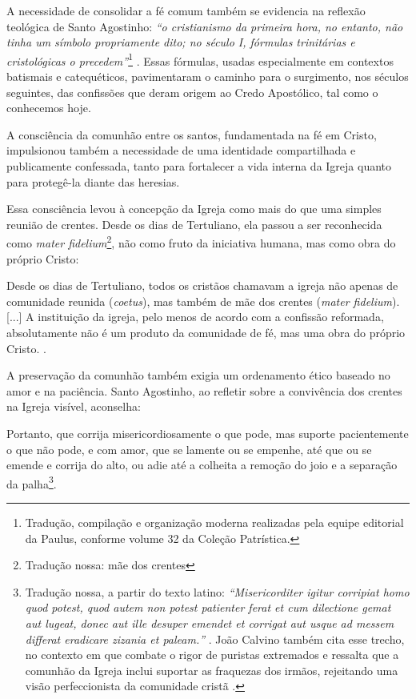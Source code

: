 A necessidade de consolidar a fé comum também se evidencia na reflexão teológica de Santo Agostinho: \textit{``o cristianismo da primeira hora, no entanto, não tinha um símbolo propriamente dito; no século I, fórmulas trinitárias e cristológicas o precedem''}\footnote{Tradução, compilação e organização moderna realizadas pela equipe editorial da Paulus, conforme volume 32 da Coleção Patrística.} \cite[p.~8]{santos2013}. Essas fórmulas, usadas especialmente em contextos batismais e catequéticos, pavimentaram o caminho para o surgimento, nos séculos seguintes, das confissões que deram origem ao Credo Apostólico, tal como o conhecemos hoje.

A consciência da comunhão entre os santos, fundamentada na fé em Cristo, impulsionou também a necessidade de uma identidade compartilhada e publicamente confessada, tanto para fortalecer a vida interna da Igreja quanto para protegê-la diante das heresias.

Essa consciência levou à concepção da Igreja como mais do que uma simples reunião de crentes. Desde os dias de Tertuliano, ela passou a ser reconhecida como \textit{mater fidelium}\footnote{Tradução nossa: mãe dos crentes}, não como fruto da iniciativa humana, mas como obra do próprio Cristo:

\begin{citacao}
    Desde os dias de Tertuliano, todos os cristãos chamavam a igreja não apenas de comunidade reunida (\textit{coetus}), mas também de mãe dos crentes (\textit{mater fidelium}). [...] A instituição da igreja, pelo menos de acordo com a confissão reformada, absolutamente não é um produto da comunidade de fé, mas uma obra do próprio Cristo. \cite[p.~335]{bavinck2012}.
\end{citacao}

A preservação da comunhão também exigia um ordenamento ético baseado no amor e na paciência. Santo Agostinho, ao refletir sobre a convivência dos crentes na Igreja visível, aconselha:

\begin{citacao}
    Portanto, que corrija misericordiosamente o que pode, mas suporte pacientemente o que não pode, e com amor, que se lamente ou se empenhe, até que ou se emende e corrija do alto, ou adie até a colheita a remoção do joio e a separação da palha\footnote{Tradução nossa, a partir do texto latino: \textit{``\foreignlanguage{latin}{Misericorditer igitur corripiat homo quod potest, quod autem non potest patienter ferat et cum dilectione gemat aut lugeat, donec aut ille desuper emendet et corrigat aut usque ad messem differat eradicare zizania et paleam.}''} \cite[livro~III, capítulo~1, seção~15]{agostinhoContraParmeniani}. João Calvino também cita esse trecho, no contexto em que combate o rigor de puristas extremados e ressalta que a comunhão da Igreja inclui suportar as fraquezas dos irmãos, rejeitando uma visão perfeccionista da comunidade cristã \cite[v.~4, cap.~1, seção~16, p.~1887]{calvino2022}.}.
\end{citacao}

